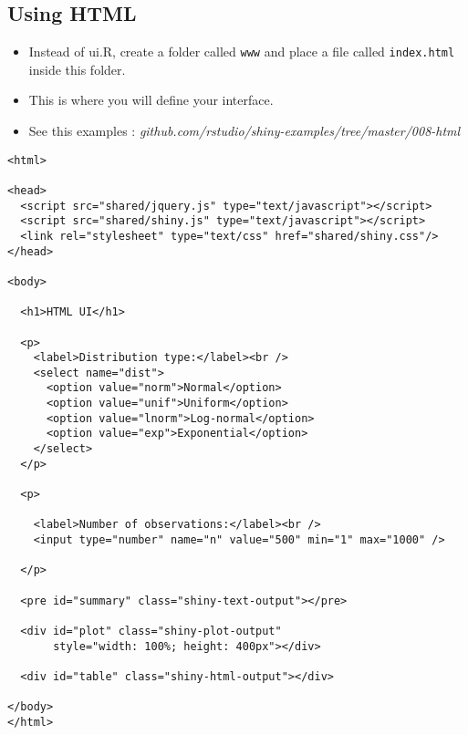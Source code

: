 \documentclass[a4paper,12pt]{article}
\begin{document}
\subsection*{Using HTML }


\begin{itemize}
\item Instead of ui.R, create a folder called \texttt{www} and place a file called \texttt{index.html}
inside this folder.
\item This is where you will define your interface.
\item See this examples :  \textit{github.com/rstudio/shiny-examples/tree/master/008-html}
\end{itemize}

\newpage
\begin{framed}
\begin{verbatim}
<html>

<head>
  <script src="shared/jquery.js" type="text/javascript"></script>
  <script src="shared/shiny.js" type="text/javascript"></script>
  <link rel="stylesheet" type="text/css" href="shared/shiny.css"/> 
</head>
 
<body>

  <h1>HTML UI</h1>
 
  <p>
    <label>Distribution type:</label><br />
    <select name="dist">
      <option value="norm">Normal</option>
      <option value="unif">Uniform</option>
      <option value="lnorm">Log-normal</option>
      <option value="exp">Exponential</option>
    </select> 
  </p>
 
  <p>
 
    <label>Number of observations:</label><br /> 
    <input type="number" name="n" value="500" min="1" max="1000" />

  </p>
 
  <pre id="summary" class="shiny-text-output"></pre> 
  
  <div id="plot" class="shiny-plot-output" 
       style="width: 100%; height: 400px"></div> 
  
  <div id="table" class="shiny-html-output"></div>
 
</body>
</html>
\end{verbatim}
\end{framed}
\end{document}
